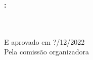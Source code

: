 \begin{folhadeaprovacao}

    \begin{center}
      {\ABNTEXchapterfont\large\MakeUppercase{\imprimirautor}}
  
      \vspace*{\fill}\vspace*{\fill}
      \begin{center}
        \ABNTEXchapterfont\bfseries\large\MakeUppercase{\imprimirtitulo}\normalfont\MakeUppercase{:
        \imprimirsubtitulo}	
      \end{center}
      \vspace*{\fill}
      
      \hfill
      \begin{minipage}{.7\textwidth}
          \imprimirpreambulo \\ \\
          E aprovado em ?/12/2022 \\
          Pela comissão organizadora
      \end{minipage}%
      \vspace*{\fill}
     \end{center}
  
\end{folhadeaprovacao}

% 

